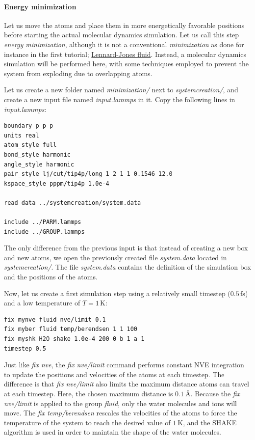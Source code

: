 \documentclass[9pt,tutorial]{livecoms}
\begin{document}
\paragraph{Energy minimization}
Let us move the atoms and place them in more energetically favorable positions before starting the actual molecular dynamics simulation. Let us call this step \textit{energy minimization}, although it is not a conventional \textit{minimization} as done for instance in the first tutorial; \hyperref[lennard-jones-label]{Lennard-Jones fluid}. Instead, a molecular dynamics simulation will be performed here, with some techniques employed to prevent the system from exploding due to overlapping atoms.

Let us create a new folder named \textit{minimization/} next to \textit{systemcreation/}, and create a new input file named \textit{input.lammps} in it. Copy the following lines in \textit{input.lammps}:
{\normalsize \begin{verbatim}
boundary p p p
units real
atom_style full
bond_style harmonic
angle_style harmonic
pair_style lj/cut/tip4p/long 1 2 1 1 0.1546 12.0
kspace_style pppm/tip4p 1.0e-4

read_data ../systemcreation/system.data

include ../PARM.lammps
include ../GROUP.lammps
\end{verbatim}}
The only difference from the previous input is that instead of creating a new box and new atoms, we open the previously created file \textit{system.data} located in \textit{systemcreation/}. The file \textit{system.data} contains the definition of the simulation box and the positions of the atoms.

Now, let us create a first simulation step using a relatively small 
timestep ($0.5\,\text{fs}$) and a low temperature of $T = 1\,\text{K}$:
{\normalsize \begin{verbatim}
fix mynve fluid nve/limit 0.1
fix myber fluid temp/berendsen 1 1 100
fix myshk H2O shake 1.0e-4 200 0 b 1 a 1
timestep 0.5
\end{verbatim}}
Just like \textit{fix nve}, the \textit{fix nve/limit} command performs constant NVE integration to update the positions and velocities of the atoms at each timestep. The difference is that \textit{fix nve/limit} also limits the maximum distance atoms can travel at each timestep. Here, the chosen maximum distance is $0.1~\text{\AA{}}$. Because the \textit{fix nve/limit} is applied to the group \textit{fluid}, only the water molecules and ions will move. The \textit{fix temp/berendsen} rescales the velocities of the atoms to force the temperature of the system to reach the desired value of $1~\text{K}$, and the SHAKE algorithm is used in order to maintain the shape of the water molecules.
\end{document}
